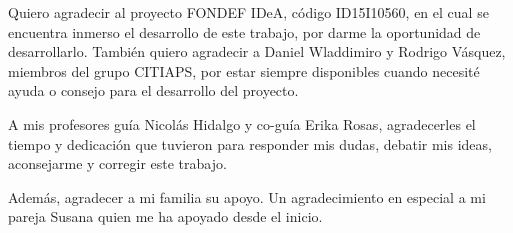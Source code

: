 \begin{agradecimiento}

Quiero agradecir al proyecto FONDEF IDeA, código ID15I10560, en el cual se encuentra inmerso el desarrollo de este trabajo, por darme la oportunidad de desarrollarlo. También quiero agradecir a Daniel Wladdimiro y Rodrigo Vásquez, miembros del grupo CITIAPS, por estar siempre disponibles cuando necesité ayuda o consejo para el desarrollo del proyecto.

A mis profesores guía Nicolás Hidalgo y co-guía Erika Rosas, agradecerles el tiempo y dedicación que tuvieron para responder mis dudas, debatir mis ideas, aconsejarme y corregir este trabajo.

Además, agradecer a mi familia su apoyo. Un agradecimiento en especial a mi pareja Susana quien me ha apoyado desde el inicio.
 
\end{agradecimiento}
